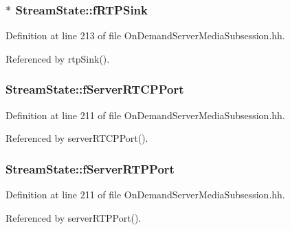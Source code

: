\subsubsection[{f\+R\+T\+P\+Sink}]{$\ast$ Stream\+State\+::f\+R\+T\+P\+Sink\hspace{0.3cm}{\ttfamily [private]}}\label{classStreamState_aac62eedf74ffa34e28b73d0a25b48929}


Definition at line 213 of file On\+Demand\+Server\+Media\+Subsession.\+hh.



Referenced by rtp\+Sink().

\subsubsection[{f\+Server\+R\+T\+C\+P\+Port}]{ Stream\+State\+::f\+Server\+R\+T\+C\+P\+Port\hspace{0.3cm}{\ttfamily [private]}}\label{classStreamState_a5f94e17ecd26e76cd42be968164983d7}


Definition at line 211 of file On\+Demand\+Server\+Media\+Subsession.\+hh.



Referenced by server\+R\+T\+C\+P\+Port().

\subsubsection[{f\+Server\+R\+T\+P\+Port}]{ Stream\+State\+::f\+Server\+R\+T\+P\+Port\hspace{0.3cm}{\ttfamily [private]}}\label{classStreamState_a6ee5725f3b01b00e56a94e56b5317095}


Definition at line 211 of file On\+Demand\+Server\+Media\+Subsession.\+hh.



Referenced by server\+R\+T\+P\+Port().

